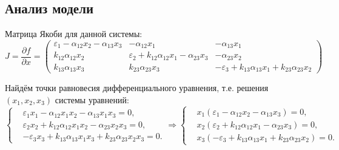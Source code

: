 \subsection{Анализ модели}
    Матрица Якоби для данной системы:
    \[
        J = \frac{\partial f}{\partial x} = \left(\begin{matrix}
            \varepsilon_1 - \alpha_{12} x_2 - \alpha_{13} x_3 & -\alpha_{12} x_1 & -\alpha_{13} x_1 \\
            k_{12} \alpha_{12} x_2 & \varepsilon_2 + k_{12} \alpha_{12} x_1 - \alpha_{23} x_3 & -\alpha_{23} x_2 \\
            k_{13} \alpha_{13} x_3 & k_{23} \alpha_{23} x_3  & -\varepsilon_3 + k_{13} \alpha_{13} x_1 + k_{23} \alpha_{23} x_2
        \end{matrix}\right)
    \]

    Найдём точки равновесия дифференциального уравнения, т.е. решения \( (x_1, x_2, x_3) \) системы уравнений:
    \[
        \left\{\begin{split}
            & \varepsilon_1 x_1 - \alpha_{12} x_1 x_2 - \alpha_{13} x_1 x_3 = 0, \\
            & \varepsilon_2 x_2 + k_{12} \alpha_{12} x_1 x_2 - \alpha_{23} x_2 x_3 = 0, \\
            & -\varepsilon_3 x_3 + k_{13} \alpha_{13} x_1 x_3 + k_{23} \alpha_{23} x_2 x_3 = 0. 
        \end{split}\right.
        \Rightarrow
        \left\{\begin{split}
            & x_1 (\varepsilon_1 - \alpha_{12} x_2 - \alpha_{13} x_3) = 0, \\
            & x_2 (\varepsilon_2 + k_{12} \alpha_{12} x_1 - \alpha_{23} x_3) = 0, \\
            & x_3 (-\varepsilon_3 + k_{13} \alpha_{13} x_1 + k_{23} \alpha_{23} x_2) = 0. 
        \end{split}\right.
    \]


